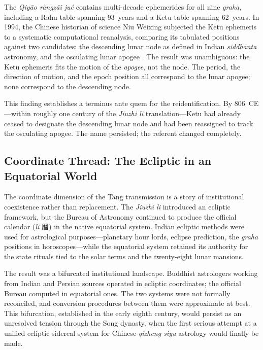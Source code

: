 \documentclass[10pt,a4paper]{article}
\newcommand{\zh}[1]{#1}
\begin{document}
The \textit{Qiy\=ao r\`angz\=ai ju\'e} contains multi-decade ephemerides for
all nine \textit{graha}, including a Rahu table spanning 93~years and a
Ketu table spanning 62~years.  In 1994, the Chinese historian of science
Niu Weixing subjected the Ketu ephemeris to a systematic computational
reanalysis, comparing its tabulated positions against two candidates:
the descending lunar node as defined in Indian \textit{siddh\=anta}
astronomy, and the osculating lunar apogee \cite{niu1995ketu}.  The
result was unambiguous: the Ketu ephemeris fits the motion of the
\emph{apogee}, not the node.  The period, the direction of motion, and
the epoch position all correspond to the lunar apogee; none correspond
to the descending node.

This finding establishes a terminus ante quem for the reidentification.
By 806~CE---within roughly one century of the \textit{Jiuzhi li}
translation---Ketu had already ceased to designate the descending
lunar node and had been reassigned to track the osculating apogee.  The
name persisted; the referent changed completely.

\subsection*{Coordinate Thread: The Ecliptic in an Equatorial World}

The coordinate dimension of the Tang transmission is a story of
institutional coexistence rather than replacement.  The \textit{Jiuzhi li}
introduced an ecliptic framework, but the Bureau of Astronomy continued
to produce the official calendar (\textit{li} \zh{曆}) in the native
equatorial system.  Indian ecliptic methods were used for astrological
purposes---planetary hour lords, eclipse prediction, the \textit{graha}
positions in horoscopes---while the equatorial system retained its
authority for the state rituals tied to the solar terms and the
twenty-eight lunar mansions.

The result was a bifurcated institutional landscape.  Buddhist
astrologers working from Indian and Persian sources operated in ecliptic
coordinates; the official Bureau computed in equatorial ones.  The two
systems were not formally reconciled, and conversion procedures between
them were approximate at best.  This bifurcation, established in the
early eighth century, would persist as an unresolved tension through the
Song dynasty, when the first serious attempt at a unified ecliptic
sidereal system for Chinese \textit{qizheng siyu} astrology would finally be made.
\end{document}
